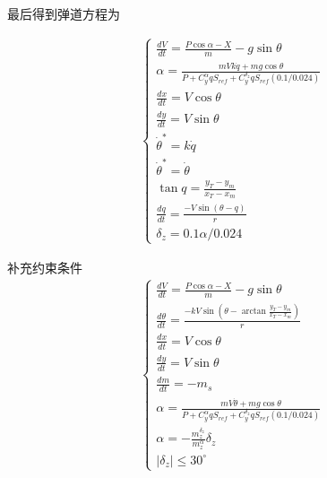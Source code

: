 \documentclass[UTF8]{ctexart}
\begin{document}
最后得到弹道方程为

\begin{align}
    \begin{cases}
        \frac{dV}{dt}=\frac{P\cos\alpha-X}{m}-g\sin\theta                                                     \\
        \alpha=\frac{mVk\dot{q}+mg\cos\theta}{P+C_{y}^{\alpha}qS_{ref}+C_{y}^{\delta_{z}}qS_{ref}(0.1/0.024)} \\
        \frac{dx}{dt}=V\cos\theta                                                                             \\
        {\frac{dy}{dt}}=V\sin\theta                                                                           \\
        \dot{\theta}^{*}=k\dot{q}                                                                             \\
        \dot{\theta}^{*}=\dot{\theta}                                                                         \\
        \tan q=\frac{y_{T}-y_{m}}{x_{T}-x_{m}}                                                                \\
        \frac{dq}{dt}=\frac{-V\sin(\theta-q)}{r}                                                              \\
        \delta_{z}=0.1\alpha/0.024
    \end{cases}
\end{align}

补充约束条件
\begin{align}
    \begin{cases}
        \frac{dV}{dt}=\frac{P\cos\alpha-X}{m}-g\sin\theta                                                         \\
        \frac{d\theta}{dt}=\frac{-kV\sin(\theta-\arctan{\frac{y_{T}-y_{m}}{x_{T}-x_{m}}})}{r}                     \\
        \frac{dx}{dt}=V\cos\theta                                                                                 \\
        {\frac{dy}{dt}}=V\sin\theta                                                                               \\
        {\frac{dm}{dt}}=-m_s                                                                                      \\
        \alpha=\frac{mV\dot{\theta}+mg\cos\theta}{P+C_{y}^{\alpha}qS_{ref}+C_{y}^{\delta_{z}}qS_{ref}(0.1/0.024)} \\
        \alpha=-\frac{m_{z}^{\delta_z}}{m_{z}^{\alpha}}\delta_{z} \\
        \left|\delta_{z} \right|\leq 30^{\circ}
    \end{cases}
\end{align}
\end{document}
